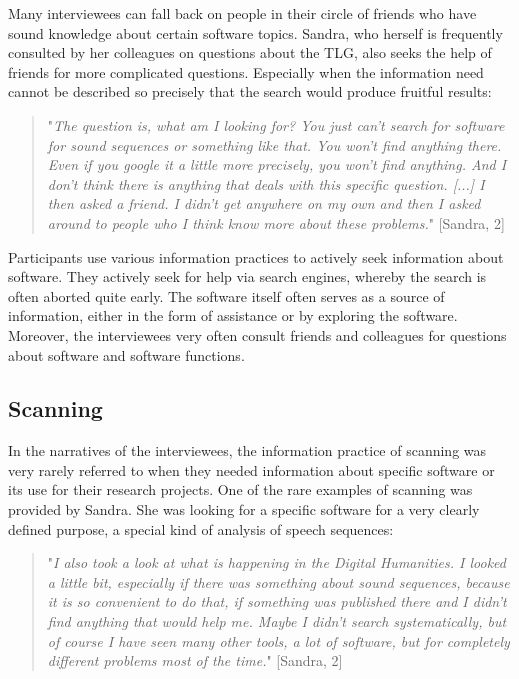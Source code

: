 \documentclass[12pt, a4paper, titlepage, oneside, abstract=true, toc=listof, toc=bibliography]{scrreprt}
\begin{document}
{Many interviewees can fall back on people in their circle of friends who have sound knowledge about certain software topics. Sandra, who herself is frequently consulted by her colleagues on questions about the TLG, also seeks the help of friends for more complicated questions. Especially when the information need cannot be described so precisely that the search would produce fruitful results:

\begin{quotation}
"\textit{The question is, what am I looking for? You just can't search for software for sound sequences or something like that. You won't find anything there. Even if you google it a little more precisely, you won't find anything. And I don't think there is anything that deals with this specific question. [...] I then asked a friend. I didn't get anywhere on my own and then I asked around to people who I think know more about these problems.}" [Sandra, 2]
\end{quotation}

Participants use various information practices to actively seek information about software. They actively seek for help via search engines, whereby the search is often aborted quite early. The software itself often serves as a source of information, either in the form of assistance or by exploring the software. Moreover, the interviewees very often consult friends and colleagues for questions about software and software functions.

%
\subsection{Scanning}
\label{sec:IP_Scanning}
In the narratives of the interviewees, the information practice of scanning was very rarely referred to when they needed information about specific software or its use for their research projects. 
One of the rare examples of scanning was provided by Sandra. She was looking for a specific software for a very clearly defined purpose, a special kind of analysis of speech sequences:

\begin{quotation}
"\textit{I also took a look at what is happening in the Digital Humanities. I looked a little bit, especially if there was something about sound sequences, because it is so convenient to do that, if something was published there and I didn't find anything that would help me. Maybe I didn't search systematically, but of course I have seen many other tools, a lot of software, but for completely different problems most of the time.}" [Sandra, 2]
\end{quotation}

}
\end{document}
